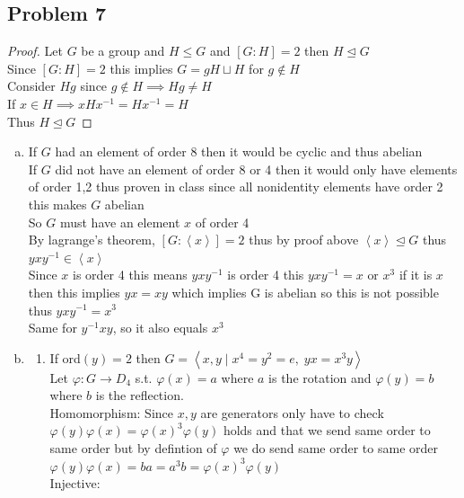 \documentclass[12pt, letterpaper]{article}
\theoremstyle{definition}
\newcommand{\ang}[1]{\left\langle #1 \right\rangle}
\begin{document}
\subsection*{Problem 7}
\begin{proof}
    Let $G$ be a group and $H \leq G$ and $[G : H] = 2$ then $H \unlhd G$\\
    Since $[G : H] = 2$ this implies $G=gH\sqcup H$ for $g \notin H$\\
    Consider $Hg$ since $g \notin H \implies Hg \neq H$\\
    If $x \in H \implies xHx^{-1}=Hx^{-1}=H$\\
    Thus $H \unlhd G$
\end{proof}
\begin{enumerate}[(a)]
    \item If $G$ had an element of order $8$ then it would be cyclic and thus abelian\\
    If $G$ did not have an element of order 8 or 4 then it would only have elements of order 1,2 thus proven in class since all nonidentity elements have order 2 this makes $G$ abelian\\
    So $G$ must have an element $x$ of order 4\\
    By lagrange's theorem, $[G : \ang{x}] =2$ thus by proof above $\ang{x} \unlhd G$ thus $yxy^{-1}\in \ang{x}$\\
    Since $x$ is order 4 this means $yxy^{-1}$ is order 4 this $yxy^{-1}=x \text{ or } x^3$ if it is $x$ then this implies $yx=xy$ which implies G is abelian so this is not possible
    thus $yxy^{-1}=x^3$\\
    Same for $y^{-1}xy$, so it also equals $x^3$
    \item \begin{enumerate}[1.]
        \item If ord$(y)=2$ then $G=\ang{x,y \mid x^4=y^2=e,\; yx=x^3y}$\\
        Let $\varphi : G \rightarrow D_4$ s.t. $\varphi(x)=a$ where $a$ is the rotation and $\varphi(y)=b$ where $b$ is the reflection.\\
        Homomorphism: Since $x,y$ are generators only have to check $\varphi(y)\varphi(x)=\varphi(x)^3\varphi(y)$ holds and that we send same order to same order but by defintion of $\varphi$ we do send same order to same order\\
        $\varphi(y)\varphi(x)=ba=a^{3}b=\varphi(x)^3\varphi(y)$\\
        Injective:\\

\end{enumerate}
\end{enumerate}
\end{document}
